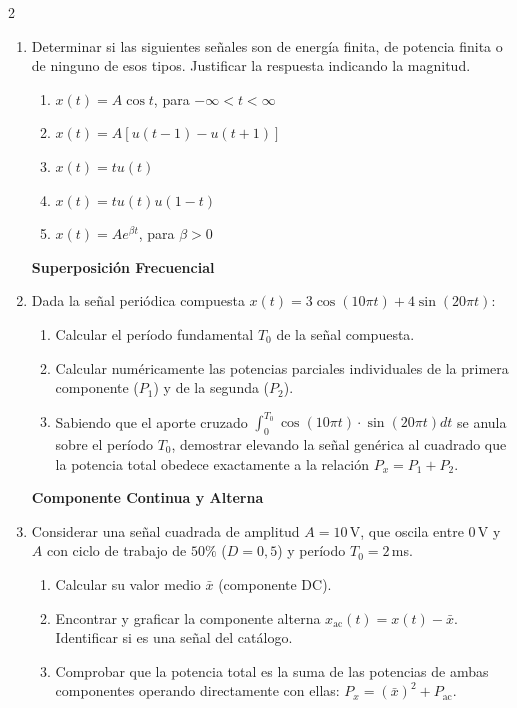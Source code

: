 \documentclass[10pt,a4paper]{article}
\begin{document}
\begin{multicols}{2}
\begin{enumerate}
			Determinar analítica y gráficamente $x(3t-6)$

			\textbf{Señales de Energía y Potencia}
			\item {Determinar si las siguientes señales son de energía finita, de potencia finita o de ninguno de esos tipos. Justificar la respuesta indicando la magnitud.}
			\begin{enumerate}
				\item $x(t)=A\cos t$, para $-\infty<t<\infty$
				\item $x(t)=A[u(t-1)-u(t+1)]$
				\item $x(t)=tu(t)$
				\item $x(t)=tu(t)u(1-t)$
				\item $x(t)=Ae^{\beta t}$, para $\beta>0$
			\end{enumerate}

            \textbf{Superposición Frecuencial}
            \item Dada la señal periódica compuesta $x(t) = 3\cos(10\pi t) + 4\sin(20\pi t)$:
            \begin{enumerate}
                \item Calcular el período fundamental $T_0$ de la señal compuesta.
                \item Calcular numéricamente las potencias parciales individuales de la primera componente ($P_1$) y de la segunda ($P_2$).
                \item Sabiendo que el aporte cruzado $\int_0^{T_0} \cos(10\pi t)\cdot \sin(20\pi t) dt$ se anula sobre el período $T_0$, demostrar elevando la señal genérica al cuadrado que la potencia total obedece exactamente a la relación $P_x = P_1 + P_2$.
            \end{enumerate}

            \textbf{Componente Continua y Alterna}
            \item Considerar una señal cuadrada de amplitud $A=10\,$V, que oscila entre $0\,$V y $A$ con ciclo de trabajo de $50\%$ ($D=0{,}5$) y período $T_0=2\,$ms.
            \begin{enumerate}
                \item Calcular su valor medio $\bar{x}$ (componente DC).
                \item Encontrar y graficar la componente alterna $x_{\mathrm{ac}}(t) = x(t) - \bar{x}$. Identificar si es una señal del catálogo.
                \item Comprobar que la potencia total es la suma de las potencias de ambas componentes operando directamente con ellas: $P_x = (\bar{x})^2 + P_{\mathrm{ac}}$.
            \end{enumerate}


\end{enumerate}
\end{multicols}
\end{document}
